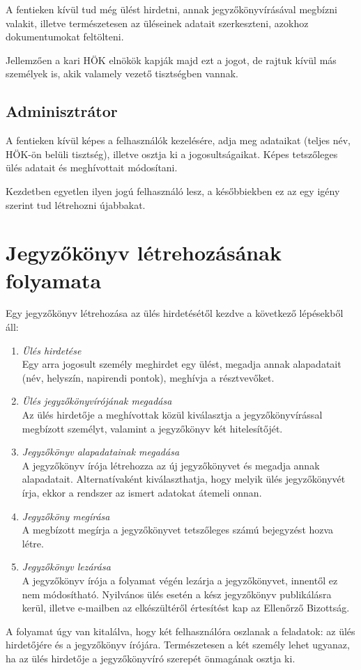 \documentclass[a4paper,12pt,oneside]{report}
\begin{document}
A fentieken kívül tud még ülést hirdetni, annak jegyzőkönyvírásával megbízni valakit, illetve természetesen az üléseinek adatait szerkeszteni, azokhoz dokumentumokat feltölteni.

Jellemzően a kari HÖK elnökök kapják majd ezt a jogot, de rajtuk kívül más személyek is, akik valamely vezető tisztségben vannak.

\subsection*{Adminisztrátor}

A fentieken kívül képes a felhasználók kezelésére, adja meg adataikat (teljes név, HÖK-ön belüli tisztség), illetve osztja ki a jogosultságaikat. Képes tetszőleges ülés adatait és meghívottait módosítani.

Kezdetben egyetlen ilyen jogú felhasználó lesz, a későbbiekben ez az egy igény szerint tud létrehozni újabbakat.

\section{Jegyzőkönyv létrehozásának folyamata}

Egy jegyzőkönyv létrehozása az ülés hirdetésétől kezdve a következő lépésekből áll:

\begin{enumerate}
  \item \emph{Ülés hirdetése}\\
    Egy arra jogosult személy meghirdet egy ülést, megadja annak alapadatait (név, helyszín, napirendi pontok), meghívja a résztvevőket.
    
  \item \emph{Ülés jegyzőkönyvírójának megadása}\\
    Az ülés hirdetője a meghívottak közül kiválasztja a jegyzőkönyvírással megbízott személyt, valamint a jegyzőkönyv két hitelesítőjét.
    
  \item \emph{Jegyzőkönyv alapadatainak megadása}\\
    A jegyzőkönyv írója létrehozza az új jegyzőkönyvet és megadja annak alapadatait. Alternatívaként kiválaszthatja, hogy melyik ülés jegyzőkönyvét írja, ekkor a rendszer az ismert adatokat átemeli onnan.

  \item \emph{Jegyzőköny megírása}\\
    A megbízott megírja a jegyzőkönyvet tetszőleges számú bejegyzést hozva létre.
    
  \item \emph{Jegyzőkönyv lezárása}\\
    A jegyzőkönyv írója a folyamat végén lezárja a jegyzőkönyvet, innentől ez nem módosítható. Nyilvános ülés esetén a kész jegyzőkönyv publikálásra kerül, illetve e-mailben az elkészültéről értesítést kap az Ellenőrző Bizottság.
  
\end{enumerate}

A folyamat úgy van kitalálva, hogy két felhasználóra oszlanak a feladatok: az ülés hirdetőjére és a jegyzőkönyv írójára. Természetesen a két személy lehet ugyanaz, ha az ülés hirdetője a jegyzőkönyvíró szerepét önmagának osztja ki.
\end{document}
